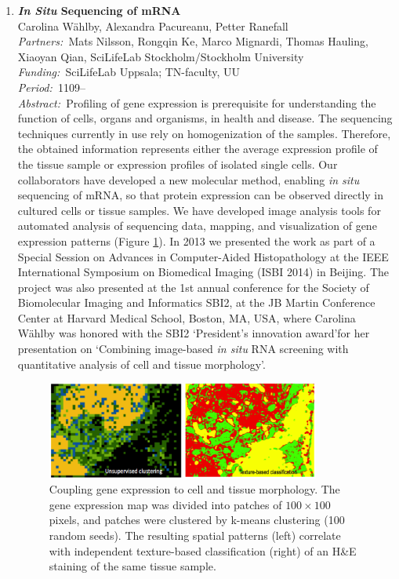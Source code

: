 \documentclass[10pt, a4paper]{article}
\newcommand{\aabstract}[1]{\emph{Abstract:~}#1}
\newcommand{\ffunding}[1]{\emph{Funding:~}#1\\}
\newcommand{\ppartners}[1]{\emph{Partners:~}#1\\}
\newcommand{\pperiod}[1]{\emph{Period:~}#1\\}
\begin{document}
{\begin{enumerate}

\item 
\textbf{\emph{In Situ} Sequencing of mRNA}\\
Carolina W\"{a}hlby, Alexandra Pacureanu, Petter Ranefall \\
\ppartners{Mats Nilsson, Rongqin Ke, Marco Mignardi, Thomas Hauling, Xiaoyan Qian, SciLifeLab Stockholm/Stockholm University}
\ffunding{SciLifeLab Uppsala; TN-faculty, UU}
\pperiod{1109--}
\aabstract{Profiling of gene expression is prerequisite for understanding the function of cells, organs and organisms, in health and disease. The sequencing techniques currently in use rely on homogenization of the samples. Therefore, the obtained information represents either the average expression profile of the tissue sample or expression profiles of isolated single cells. Our collaborators have developed a new molecular method, enabling \emph{in situ} sequencing of mRNA, so that protein expression can be observed directly in cultured cells or tissue samples. We have developed image analysis tools for automated analysis of sequencing data, mapping, and visualization of gene expression patterns (Figure \ref{fig:carolina_insitu}). In 2013 we presented the work as part of a Special Session on Advances in Computer-Aided Histopathology at the IEEE International Symposium on Biomedical Imaging (ISBI 2014) in Beijing. The project was also presented at the 1st annual conference for the Society of Biomolecular Imaging and Informatics SBI2, at the JB Martin Conference Center at Harvard Medical School, Boston, MA, USA, where Carolina W\"ahlby was honored with the SBI2 \lq President's innovation award\rq for her presentation on \lq Combining image-based \emph{in situ} RNA screening with quantitative analysis of cell and tissue morphology\rq.}

\begin{figure}[!h]
\centering
\includegraphics[width=0.85\textwidth]{figures/research/insitumrna.png}
\caption{\label{fig:carolina_insitu} Coupling gene expression to cell and tissue morphology. The gene expression map was divided into patches of $100\times100$ pixels, and patches were clustered by k-means clustering (100 random seeds). The resulting spatial patterns (left) correlate with independent texture-based classification (right) of an H\&E staining of the same tissue sample.} 
\end{figure}


\end{enumerate}}
\end{document}
